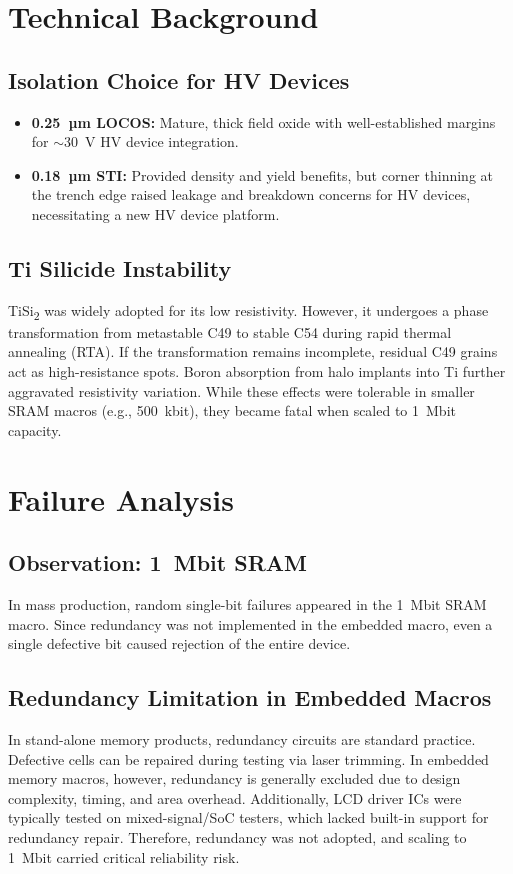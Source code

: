 \documentclass[conference]{IEEEtran}
\begin{document}
\section{Technical Background}
\subsection{Isolation Choice for HV Devices}
\begin{itemize}
    \item \textbf{0.25~µm LOCOS:} Mature, thick field oxide with well-established margins for $\sim$30~V HV device integration.
    \item \textbf{0.18~µm STI:} Provided density and yield benefits, but corner thinning at the trench edge raised leakage and breakdown concerns for HV devices, necessitating a new HV device platform.
\end{itemize}

\subsection{Ti Silicide Instability}
TiSi\textsubscript{2} was widely adopted for its low resistivity. However, it undergoes a phase transformation from metastable C49 to stable C54 during rapid thermal annealing (RTA).  
If the transformation remains incomplete, residual C49 grains act as high-resistance spots.  
Boron absorption from halo implants into Ti further aggravated resistivity variation.  
While these effects were tolerable in smaller SRAM macros (e.g., 500~kbit), they became fatal when scaled to 1~Mbit capacity.

\section{Failure Analysis}
\subsection{Observation: 1~Mbit SRAM}
In mass production, random single-bit failures appeared in the 1~Mbit SRAM macro. Since redundancy was not implemented in the embedded macro, even a single defective bit caused rejection of the entire device.

\subsection{Redundancy Limitation in Embedded Macros}
In stand-alone memory products, redundancy circuits are standard practice. Defective cells can be repaired during testing via laser trimming.  
In embedded memory macros, however, redundancy is generally excluded due to design complexity, timing, and area overhead.  
Additionally, LCD driver ICs were typically tested on mixed-signal/SoC testers, which lacked built-in support for redundancy repair.  
Therefore, redundancy was not adopted, and scaling to 1~Mbit carried critical reliability risk.
\end{document}
